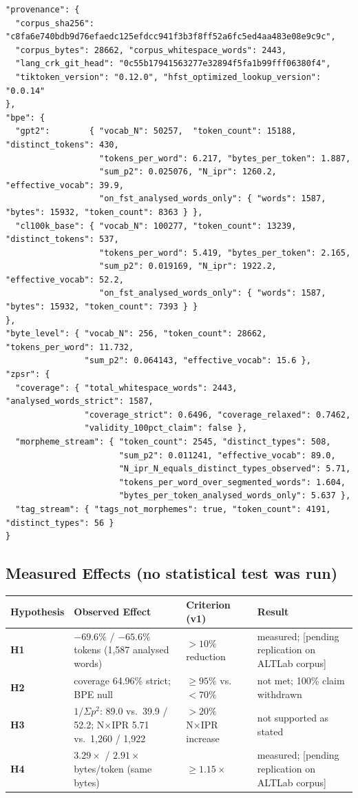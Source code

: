 \documentclass[11pt,oneside]{article}
\begin{document}
\begin{lstlisting}
"provenance": {
  "corpus_sha256": "c8fa6e740bdb9d76efaedc125efdcc941f3b3f8ff52a6fc5ed4aa483e08e9c9c",
  "corpus_bytes": 28662, "corpus_whitespace_words": 2443,
  "lang_crk_git_head": "0c55b17941563277e32894f5fa1b99fff06380f4",
  "tiktoken_version": "0.12.0", "hfst_optimized_lookup_version": "0.0.14"
},
"bpe": {
  "gpt2":        { "vocab_N": 50257,  "token_count": 15188, "distinct_tokens": 430,
                   "tokens_per_word": 6.217, "bytes_per_token": 1.887,
                   "sum_p2": 0.025076, "N_ipr": 1260.2, "effective_vocab": 39.9,
                   "on_fst_analysed_words_only": { "words": 1587, "bytes": 15932, "token_count": 8363 } },
  "cl100k_base": { "vocab_N": 100277, "token_count": 13239, "distinct_tokens": 537,
                   "tokens_per_word": 5.419, "bytes_per_token": 2.165,
                   "sum_p2": 0.019169, "N_ipr": 1922.2, "effective_vocab": 52.2,
                   "on_fst_analysed_words_only": { "words": 1587, "bytes": 15932, "token_count": 7393 } }
},
"byte_level": { "vocab_N": 256, "token_count": 28662, "tokens_per_word": 11.732,
                "sum_p2": 0.064143, "effective_vocab": 15.6 },
"zpsr": {
  "coverage": { "total_whitespace_words": 2443, "analysed_words_strict": 1587,
                "coverage_strict": 0.6496, "coverage_relaxed": 0.7462,
                "validity_100pct_claim": false },
  "morpheme_stream": { "token_count": 2545, "distinct_types": 508,
                       "sum_p2": 0.011241, "effective_vocab": 89.0,
                       "N_ipr_N_equals_distinct_types_observed": 5.71,
                       "tokens_per_word_over_segmented_words": 1.604,
                       "bytes_per_token_analysed_words_only": 5.637 },
  "tag_stream": { "tags_not_morphemes": true, "token_count": 4191, "distinct_types": 56 }
}
\end{lstlisting}

\subsection{Measured Effects (no statistical test was run)}

\begin{center}
\begin{tabular}{llll}
\toprule
Hypothesis & Observed Effect & Criterion (v1) & Result \\
\midrule
\textbf{H1} & $-69.6\%$ / $-65.6\%$ tokens (1,587 analysed words) & $>10\%$ reduction & measured; [pending replication on ALTLab corpus] \\
\textbf{H2} & coverage 64.96\% strict; BPE null & $\geq 95\%$ vs.\ $<70\%$ & not met; 100\% claim withdrawn \\
\textbf{H3} & $1/\Sigma p^2$: 89.0 vs.\ 39.9 / 52.2; N×IPR 5.71 vs.\ 1,260 / 1,922 & $>20\%$ N×IPR increase & not supported as stated \\
\textbf{H4} & $3.29\times$ / $2.91\times$ bytes/token (same bytes) & $\geq 1.15\times$ & measured; [pending replication on ALTLab corpus] \\
\bottomrule
\end{tabular}
\end{center}
\end{document}
